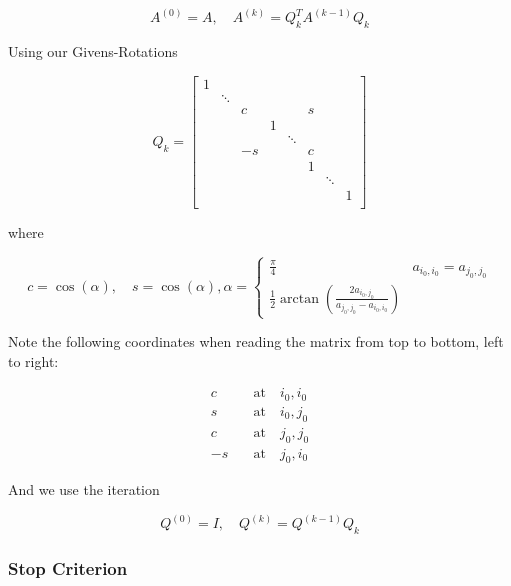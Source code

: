 \[
    A^{(0)} = A, \quad A^{(k)} = Q_k^T A^{(k - 1)} Q_k
\]

Using our Givens-Rotations 

\[
    Q_k = 
    \begin{bmatrix}
        1 &        &    &         &        &        &         &   \\
          & \ddots &    &         &        &        &         &   \\
          &        & c  &         &        &   s    &         &   \\
          &        &    &   1     &        &        &         &   \\
          &        &    &         & \ddots &        &         &   \\
          &        & -s &         &        &   c    &         &   \\
          &        &    &         &        &   1    &         &   \\
          &        &    &         &        &        & \ddots  &   \\
          &        &    &         &        &        &         & 1 \\
    \end{bmatrix}
\]


where 


\[
   c = \cos(\alpha), \quad s = \cos(\alpha), \alpha = 
   \begin{cases}
    \frac{\pi}{4}  & a_{i_0, i_0} = a_{j_0, j_0} \\ 
    \frac{1}{2}\arctan\left(\frac{2a_{i_0, j_0}}{a_{j_0, j_0} - a_{i_0, i_0}}\right)
   \end{cases} 
\]

Note the following coordinates when reading the matrix from top to bottom, left to right:

\begin{align*}
    c & \quad \text{at} \quad i_0, i_0 \\ 
    s & \quad \text{at} \quad i_0, j_0 \\
    c & \quad \text{at} \quad j_0, j_0 \\
    -s & \quad \text{at} \quad j_0, i_0
\end{align*}

And we use the iteration 

\[
    Q^{(0)} = I, \quad Q^{(k)} = Q^{(k - 1)}Q_k
\]

\subsubsection*{Stop Criterion}

